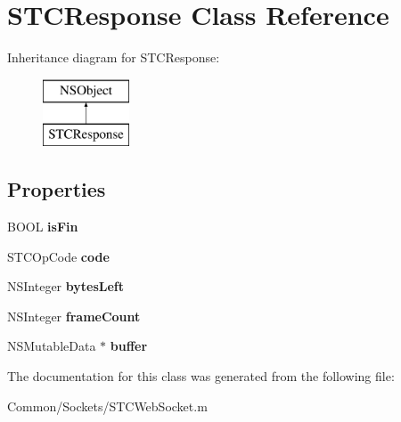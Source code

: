 \hypertarget{interface_s_t_c_response}{}\section{S\+T\+C\+Response Class Reference}
\label{interface_s_t_c_response}
Inheritance diagram for S\+T\+C\+Response\+:\begin{figure}[H]
\begin{center}
\leavevmode
\includegraphics[height=2.000000cm]{interface_s_t_c_response}
\end{center}
\end{figure}
\subsection*{Properties}
\begin{DoxyCompactItemize}
\item 
\hypertarget{interface_s_t_c_response_a7e5c4654b7433c4c0592a081093ff98c}{}\label{interface_s_t_c_response_a7e5c4654b7433c4c0592a081093ff98c} 
B\+O\+OL {\bfseries is\+Fin}
\item 
\hypertarget{interface_s_t_c_response_a23b0ddb2e71e623ca7743d937ab47e8a}{}\label{interface_s_t_c_response_a23b0ddb2e71e623ca7743d937ab47e8a} 
S\+T\+C\+Op\+Code {\bfseries code}
\item 
\hypertarget{interface_s_t_c_response_a5354e111607ad199d3c3541b1eacb2f9}{}\label{interface_s_t_c_response_a5354e111607ad199d3c3541b1eacb2f9} 
N\+S\+Integer {\bfseries bytes\+Left}
\item 
\hypertarget{interface_s_t_c_response_a26bb9b94cab90ed6aabda5e41d5f6237}{}\label{interface_s_t_c_response_a26bb9b94cab90ed6aabda5e41d5f6237} 
N\+S\+Integer {\bfseries frame\+Count}
\item 
\hypertarget{interface_s_t_c_response_a786a44dff8aa53cf498a54281daa895b}{}\label{interface_s_t_c_response_a786a44dff8aa53cf498a54281daa895b} 
N\+S\+Mutable\+Data $\ast$ {\bfseries buffer}
\end{DoxyCompactItemize}


The documentation for this class was generated from the following file\+:\begin{DoxyCompactItemize}
\item 
Common/\+Sockets/S\+T\+C\+Web\+Socket.\+m\end{DoxyCompactItemize}
